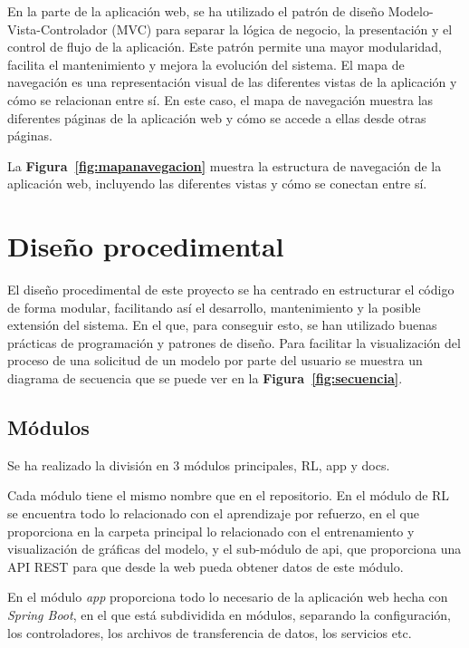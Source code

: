 En la parte de la aplicación web, se ha utilizado el patrón de diseño Modelo-Vista-Controlador (MVC) para separar la lógica de negocio, la presentación y el control de flujo de la aplicación. Este patrón permite una mayor modularidad, facilita el mantenimiento y mejora la evolución del sistema. 
El mapa de navegación es una representación visual de las diferentes vistas de la aplicación y cómo se relacionan entre sí. En este caso, el mapa de navegación muestra las diferentes páginas de la aplicación web y cómo se accede a ellas desde otras páginas.

La \textbf{Figura~\ref{fig:mapanavegacion}} muestra la estructura de navegación de la aplicación web, incluyendo las diferentes vistas y cómo se conectan entre sí.

\section{Diseño procedimental}
El diseño procedimental de este proyecto se ha centrado en estructurar el código de forma modular, facilitando así el desarrollo, mantenimiento y la posible extensión del sistema. En el que, para conseguir esto, se han utilizado buenas prácticas de programación y patrones de diseño. Para facilitar la visualización del proceso de una solicitud de un modelo por parte del usuario se muestra un diagrama de secuencia que se puede ver en la \textbf{Figura~\ref{fig:secuencia}}.

\subsection{Módulos}
Se ha realizado la división en 3 módulos principales, RL, app y docs.

Cada módulo tiene el mismo nombre que en el repositorio.
En el módulo de RL se encuentra todo lo relacionado con el aprendizaje por refuerzo, en el que proporciona en la carpeta principal lo relacionado con el entrenamiento y visualización de gráficas del modelo, y el sub-módulo de api, que proporciona una API REST para que desde la web pueda obtener datos de este módulo.

En el módulo \textit{app} proporciona todo lo necesario de la aplicación web hecha con \textit{Spring Boot}, en el que está subdividida en módulos, separando la configuración, los controladores, los archivos de transferencia de datos, los servicios etc.

